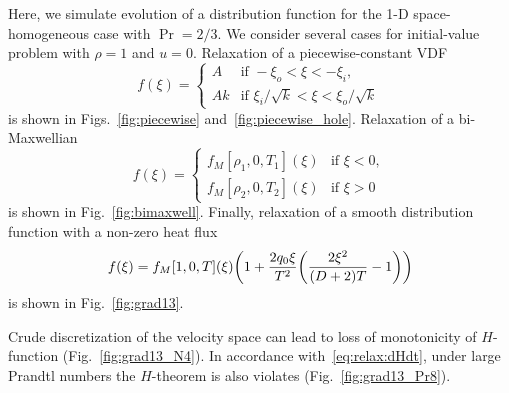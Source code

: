 \documentclass{article}
\begin{document}
Here, we simulate evolution of a distribution function for the 1-D space-homogeneous case with $\Pr = 2/3$.
We consider several cases for initial-value problem with $\rho=1$ and $u=0$.
Relaxation of a piecewise-constant VDF
\begin{equation}\label{eq:piecewise}
    f(\xi) = \begin{cases}
        A &\text{if } -\xi_o < \xi < -\xi_i, \\
        Ak &\text{if } \xi_i/\sqrt{k} < \xi < \xi_o/\sqrt{k}
    \end{cases}
\end{equation}
is shown in Figs.~\ref{fig:piecewise} and~\ref{fig:piecewise_hole}.
Relaxation of a bi-Maxwellian
\begin{equation}\label{eq:bimaxwell}
    f(\xi) = \begin{cases}
        f_M[\rho_1, 0, T_1](\xi) &\text{if } \xi < 0, \\
        f_M[\rho_2, 0, T_2](\xi) &\text{if } \xi > 0
    \end{cases}
\end{equation}
is shown in Fig.~\ref{fig:bimaxwell}.
Finally, relaxation of a smooth distribution function with a non-zero heat flux
\begin{equation}\label{eq:grad13}
    f(\xi) = f_M[1, 0, T](\xi)\qty(1 + \frac{2q_0\xi}{T^2}\qty(\frac{2\xi^2}{(D+2)T} - 1))
\end{equation}
is shown in Fig.~\ref{fig:grad13}.

Crude discretization of the velocity space can lead to loss of monotonicity of $H$-function (Fig.~\ref{fig:grad13_N4}).
In accordance with~\eqref{eq:relax:dHdt}, under large Prandtl numbers the $H$-theorem is also violates (Fig.~\ref{fig:grad13_Pr8}).


\printbibliography
\end{document}
